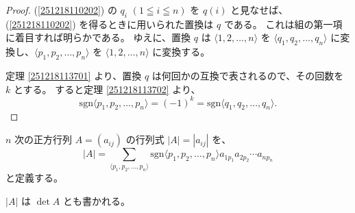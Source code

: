 \begin{proof}
  (\ref{251218110202}) の \(q_i\) \((1\leqq i\leqq n)\) を \(q(i)\) と見なせば、(\ref{251218110202}) を得るときに用いられた置換は \(q\) である。
  これは組の第一項に着目すれば明らかである。
  ゆえに、置換 \(q\) は \(\langle 1,2,\ldots,n\rangle\) を \(\langle q_1,q_2,\ldots,q_n\rangle\) に変換し、\(\langle p_1,p_2,\ldots,p_n\rangle\) を \(\langle 1,2,\ldots,n\rangle\) に変換する。

  定理 \ref{251218113701} より、置換 \(q\) は何回かの互換で表されるので、その回数を \(k\) とする。
  すると定理 \ref{251218113702} より、
  \[\mathrm{sgn}\langle p_1,p_2,\ldots,p_n\rangle=(-1)^k=\mathrm{sgn}\langle q_1,q_2,\ldots,q_n\rangle.\]
\end{proof}

\begin{dfn}[行列式]\label{251218223401}
  \(n\) 次の正方行列 \(A=(a_{ij})\) の行列式 \(|A|=|a_{ij}|\) を、
  \[|A|=\sum_{\langle p_1,p_2,\ldots,p_n\rangle}\mathrm{sgn}\langle p_1,p_2,\ldots,p_n\rangle a_{1 p_1}a_{2 p_2}\cdots a_{n p_n}\]
  と定義する。

  \(|A|\) は \(\det A\) とも書かれる。
\end{dfn}

